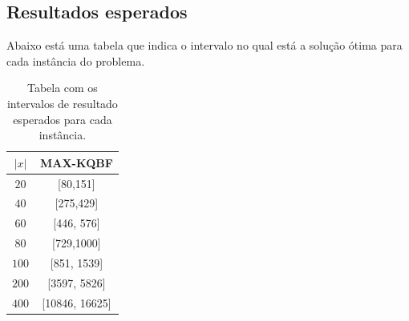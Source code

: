 \documentclass[11pt]{article}
\begin{document}
\begin{appendices}
\section{Resultados esperados}

Abaixo está uma tabela que indica o intervalo no qual está a solução ótima para cada instância do problema.

\begin{table}[H]
    \centering
    \begin{tabular}{cc}
    $|x|$ & \multicolumn{1}{l}{MAX-KQBF} \\\hline
    $20$ & [80,151] \\
    $40$ & [275,429] \\
    $60$ & [446, 576] \\
    $80$ & [729,1000] \\
    $100$ & [851, 1539] \\
    $200$ & [3597, 5826] \\
    $400$ & [10846, 16625]
    \end{tabular}
    \caption{Tabela com os intervalos de resultado esperados para cada instância.}
    \label{table:intervalos}
\end{table}

\end{appendices}
\end{document}
